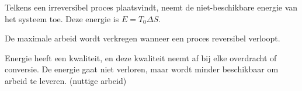 \begin{postulate}
   Telkens een irreversibel proces plaatsvindt, neemt de niet-beschikbare energie van het systeem toe.
   Deze energie is \(E = T_0 \Delta S\).
\end{postulate}

\begin{postulate}
    De maximale arbeid wordt verkregen wanneer een proces reversibel verloopt.
\end{postulate}

\begin{postulate}
    Energie heeft een kwaliteit, en deze kwaliteit neemt af bij elke overdracht of conversie.
    De energie gaat niet verloren, maar wordt minder beschikbaar om arbeid te leveren. (nuttige arbeid)
\end{postulate}
